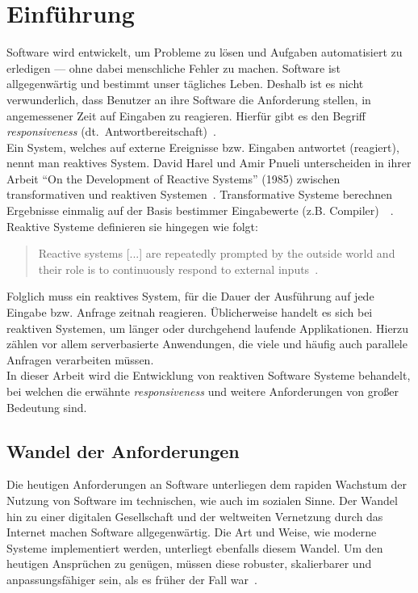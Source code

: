 \chapter{Einführung}\label{sec:einfuehrung}
Software wird entwickelt, um Probleme zu lösen und Aufgaben automatisiert zu erledigen --- ohne dabei menschliche Fehler zu machen. Software ist allgegenwärtig und bestimmt unser tägliches Leben. Deshalb ist es nicht verwunderlich, dass Benutzer an ihre Software die Anforderung stellen, in angemessener Zeit auf Eingaben zu reagieren. Hierfür gibt es den Begriff \textit{responsiveness} (dt.\ Antwortbereitschaft)~\cite[S.~18]{kuhn_reactive_2015}.\\
Ein System, welches auf externe Ereignisse bzw. Eingaben antwortet (reagiert), nennt man reaktives System. David Harel und Amir Pnueli unterscheiden in ihrer Arbeit \enquote{On the Development of Reactive Systems} (1985) zwischen transformativen und reaktiven Systemen~\cite{harel_development_1985}. Transformative Systeme berechnen Ergebnisse einmalig auf der Basis bestimmer Eingabewerte (z.B. Compiler)~\cite[S.~2]{carkci_dataflow_2014}~\cite{wieringa_design_2003}. Reaktive Systeme definieren sie hingegen wie folgt:

\begin{quotation}
  Reactive systems [...] are repeatedly prompted by the outside world and their role is to continuously respond to external inputs~\cite{harel_development_1985}.
\end{quotation}

Folglich muss ein reaktives System, für die Dauer der Ausführung auf jede Eingabe bzw. Anfrage zeitnah reagieren. Üblicherweise handelt es sich bei reaktiven Systemen, um länger oder durchgehend laufende Applikationen. Hierzu zählen vor allem serverbasierte Anwendungen, die viele und häufig auch parallele Anfragen verarbeiten müssen.\\
In dieser Arbeit wird die Entwicklung von reaktiven Software Systeme behandelt, bei welchen die erwähnte \textit{responsiveness} und weitere Anforderungen von großer Bedeutung sind.

\pagebreak

\section{Wandel der Anforderungen}
Die heutigen Anforderungen an Software unterliegen dem rapiden Wachstum der Nutzung von Software im technischen, wie auch im sozialen Sinne. Der Wandel hin zu einer digitalen Gesellschaft und der weltweiten Vernetzung durch das Internet machen Software allgegenwärtig. Die Art und Weise, wie moderne Systeme implementiert werden, unterliegt ebenfalls diesem Wandel. Um den heutigen Ansprüchen zu genügen, müssen diese robuster, skalierbarer und anpassungsfähiger sein, als es früher der Fall war~\cite{boner_reactive_2014}.\\

